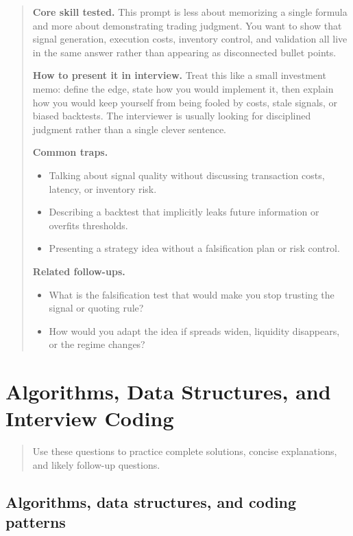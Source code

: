 \documentclass[11pt,letterpaper,openany]{book}
\newcommand{\ChapterIntro}[1]{%
  \begin{quote}\small #1\end{quote}%
}
\newenvironment{EditorialNote}
  {\begin{quote}\small\setlength{\parskip}{0.25em}}
  {\end{quote}}
\newcommand{\QuestionSpacer}{\vspace{0.4em}}
\begin{document}
\begin{EditorialNote}


\textbf{Core skill tested.} This prompt is less about memorizing a single formula and more about demonstrating trading judgment. You want to show that signal generation, execution costs, inventory control, and validation all live in the same answer rather than appearing as disconnected bullet points.

\textbf{How to present it in interview.} Treat this like a small investment memo: define the edge, state how you would implement it, then explain how you would keep yourself from being fooled by costs, stale signals, or biased backtests. The interviewer is usually looking for disciplined judgment rather than a single clever sentence.

\textbf{Common traps.}
\begin{itemize}
\item Talking about signal quality without discussing transaction costs, latency, or inventory risk.
\item Describing a backtest that implicitly leaks future information or overfits thresholds.
\item Presenting a strategy idea without a falsification plan or risk control.
\end{itemize}

\textbf{Related follow-ups.}
\begin{itemize}
\item What is the falsification test that would make you stop trusting the signal or quoting rule?
\item How would you adapt the idea if spreads widen, liquidity disappears, or the regime changes?
\end{itemize}


\end{EditorialNote}
\QuestionSpacer

\section{Algorithms, Data Structures, and Interview Coding}
\ChapterIntro{Use these questions to practice complete solutions, concise explanations, and likely follow-up questions.}

\subsection{Algorithms, data structures, and coding patterns}
\end{document}
